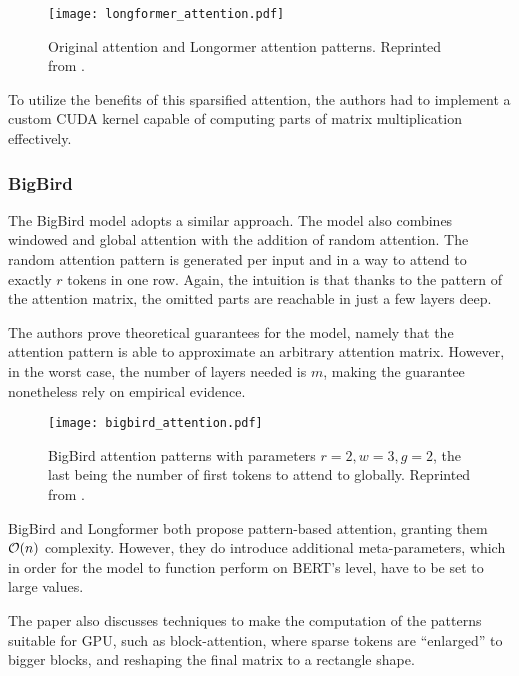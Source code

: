 \begin{figure}[!htb]
        \centering
        \texttt{[image: longformer\_attention.pdf]}
        \caption[Longformer Attention Patterns]{Original attention and Longormer attention patterns. Reprinted from \citep{longformer}.}
        \label{fig:longformer_attention}
\end{figure}

To utilize the benefits of this sparsified attention, the authors had to implement a custom CUDA kernel capable of computing parts of matrix multiplication effectively.

\subsubsection{BigBird}

The BigBird model \citep{bigbird} adopts a similar approach.
The model also combines windowed and global attention with the addition of random attention.
The random attention pattern is generated per input and in a way to attend to exactly $r$ tokens in one row. Again, the intuition is that thanks to the pattern of the attention matrix, the omitted parts are reachable in just a few layers deep.

The authors prove theoretical guarantees for the model, namely that the attention pattern is able to approximate an arbitrary attention matrix.
However, in the worst case, the number of layers needed is $m$, making the guarantee nonetheless rely on empirical evidence.

\begin{figure}[!htb]
        \centering
        \texttt{[image: bigbird\_attention.pdf]}
        \caption[BigBird Attention Patterns]{BigBird attention patterns with parameters $r=2, w=3, g=2$, the last being the number of first tokens to attend to globally. Reprinted from \citep{bigbird}.}
        \label{fig:bigbird_attention}
\end{figure}

BigBird and Longformer both propose pattern-based attention, granting them $\mathcal{O}(n)$ complexity.
However, they do introduce additional meta-parameters, which in order for the model to function perform on BERT's level, have to be set to large values. 

The paper also discusses techniques to make the computation of the patterns suitable for GPU, such as block-attention, where sparse tokens are ``enlarged'' to bigger blocks, and reshaping the final matrix to a rectangle shape.

